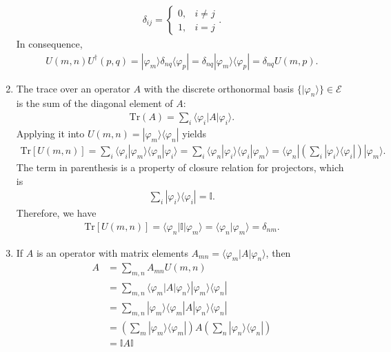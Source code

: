 \documentclass[letterpaper,11pt,twoside]{article}
\begin{document}
\begin{enumerate}[itemsep=0pt,topsep=0pt,label=\alph*.]
  \begin{align*}
    \delta_{ij}=\begin{cases}
      0,&i\neq j\\
      1,&i=j
    \end{cases}.
  \end{align*}
  In consequence,
  \begin{align*}
    U(m,n)U^\dagger (p,q)=|\varphi_m\rangle\delta_{nq}\langle\varphi_p|=\delta_{nq}|\varphi_m\rangle\langle\varphi_p|=\delta_{nq}U(m,p).
  \end{align*}
  \item The trace over an operator $A$ with the discrete orthonormal basis $\{|\varphi_n\rangle\}\in\mathcal{E}$ is the sum of 
  the diagonal element of $A$:
  \begin{align*}
    \text{Tr}(A)=\sum_i\langle \varphi_i|A|\varphi_i\rangle.
  \end{align*}
  Applying it into $U(m,n)=|\varphi_m\rangle\langle\varphi_n|$ yields
  \begin{align*}
    \text{Tr}[U(m,n)]=\sum_i\langle \varphi_i|\varphi_m\rangle\langle\varphi_n|\varphi_i\rangle=\sum_i\langle\varphi_n|\varphi_i\rangle\langle \varphi_i|\varphi_m\rangle=\langle\varphi_n|\left(\sum_i|\varphi_i\rangle\langle\varphi_i|\right)|\varphi_m\rangle.
  \end{align*}
  The term in parenthesis is a property of closure relation for projectors, which is 
  \begin{align*}
    \sum_i|\varphi_i\rangle\langle\varphi_i|=\mathbb{I}.
  \end{align*}
  Therefore, we have 
  \begin{align*}
    \text{Tr}[U(m,n)]=\langle\varphi_n|\mathbb{I}|\varphi_m\rangle=\langle\varphi_n|\varphi_m\rangle=\delta_{nm}.
  \end{align*}
  \item If $A$ is an operator with matrix elements $A_{mn}=\langle\varphi_m|A|\varphi_n\rangle$, then
  \begin{align*}
    A&=\sum_{m,n}A_{mn}U(m,n)\\
    &=\sum_{m,n}\langle\varphi_m|A|\varphi_n\rangle |\varphi_m\rangle\langle\varphi_n|\\
    &=\sum_{m,n}|\varphi_m\rangle\langle\varphi_m|A|\varphi_n\rangle\langle\varphi_n|\\
    &=\left(\sum_m|\varphi_m\rangle\langle\varphi_m|\right)A\left(\sum_n|\varphi_n\rangle\langle\varphi_n|\right)\\
    &=\mathbb{I}A\mathbb{I}\\

\end{align*}
\end{enumerate}
\end{document}
